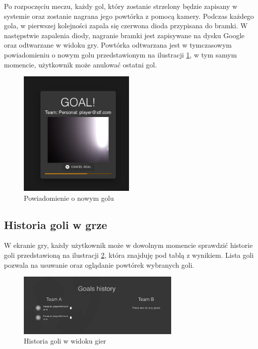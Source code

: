 Po rozpoczęciu meczu, każdy gol, który zostanie strzelony będzie zapisany w systemie oraz zostanie nagrana jego powtórka z pomocą kamery. Podczas każdego gola, w pierwszej kolejności zapala się czerwona dioda przypisana do bramki. W następstwie zapalenia diody, nagranie bramki jest zapisywane na dysku Google oraz odtwarzane w widoku gry. Powtórka odtwarzana jest w tymczasowym powiadomieniu o nowym golu przedstawionym na ilustracji \ref{fig:newGoal}, w tym samym momencie, użytkownik może anulować ostatni gol.

\begin{figure}[h!]
  \centering
    \includegraphics[width=0.5\textwidth]{images/player/newgoal.png}
  \caption{Powiadomienie o nowym golu}
  \label{fig:newGoal}
\end{figure}

\subsection{Historia goli w grze}
W ekranie gry, każdy użytkownik może w dowolnym momencie sprawdzić historie goli przedstawioną na ilustracji \ref{fig:goals-history}, która znajduję pod tablą z wynikiem. Lista goli pozwala na usuwanie oraz oglądanie powtórek wybranych goli.

\begin{figure}[h!]
  \centering
    \includegraphics[width=0.7\textwidth]{images/player/goals history.png}
  \caption{Historia goli w widoku gier}
  \label{fig:goals-history}
\end{figure}

